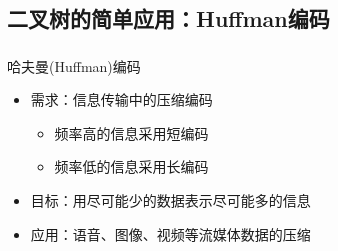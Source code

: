 \subsection{二叉树的简单应用：Huffman编码}

\begin{frame}
    \frametitle{\insertsubsectionhead}
    \begin{exampleblock}{哈夫曼(Huffman)编码}
        \begin{itemize}
            \item 需求：信息传输中的压缩编码
                \begin{itemize}
                    \item 频率\alert{高}的信息采用\alert{短}编码
                    \item 频率\alert{低}的信息采用\alert{长}编码
                \end{itemize}
            \item 目标：用尽可能少的数据表示尽可能多的信息
            \item 应用：语音、图像、视频等流媒体数据的压缩
        \end{itemize}
    \end{exampleblock}
\end{frame}

